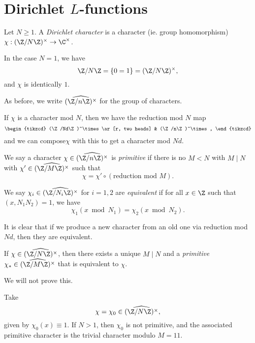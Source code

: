 \documentclass[a4paper]{article}
\begin{document}
\section{Dirichlet \texorpdfstring{$L$}{L}-functions}
\begin{defi}
  Let $N \geq 1$. A \emph{Dirichlet character} is a character (ie. group homomorphism) $\chi: (\Z/N\Z)^\times \to \C^\times$.  

  In the case $N = 1$, we have
  \[
    \Z/N\Z = \{0 = 1\} = (\Z/N\Z)^\times,
  \]
  and $\chi$ is identically $1$.

  As before, we write $\widehat{(\Z/n\Z)^\times}$ for the group of characters.
\end{defi}

If $\chi$ is a character mod $N$, then we have the reduction mod $N$ map
\[
  \begin{tikzcd}
    (\Z/Nd\Z)^\times \ar[r, two heads] & (\Z/n\Z)^\times,
  \end{tikzcd}
\]
and we can compose$\chi$ with this to get a character mod $Nd$.
\begin{defi}
  We say a character $\chi \in \widehat{(\Z/n\Z)^\times}$ is \emph{primitive} if there is no $M < N$ with $M \mid N$ with $\chi' \in \widehat{(\Z/M\Z)^\times}$ such that
  \[
    \chi = \chi' \circ (\text{reduction mod $M$}).
  \]
\end{defi}

\begin{defi}
  We say $\chi_i \in \widehat{(\Z/N_i\Z)^\times}$ for $i = 1, 2$ are \emph{equivalent} if for all $x \in \Z$ such that $(x, N_1 N_2) = 1$, we have
  \[
    \chi_1(x \bmod N_1) = \chi_2(x \bmod N_2).
  \]
\end{defi}
It is clear that if we produce a new character from an old one via reduction mod $Nd$, then they are equivalent.

\begin{prop}
  If $\chi \in \widehat{(\Z/N\Z)^\times}$, then there exists a unique $M \mid N$ and a \emph{primitive} $\chi_* \in \widehat{(\Z/M\Z)^\times}$ that is equivalent to $\chi$.
\end{prop}
We will not prove this.

\begin{eg}
  Take
  \[
    \chi = \chi_0 \in \widehat{(\Z/N\Z)^\times},
  \]
  given by $\chi_0(x) \equiv 1$. If $N > 1$, then $\chi_0$ is not primitive, and the associated primitive character is the trivial character modulo $M = 11$.
\end{eg}
\end{document}
